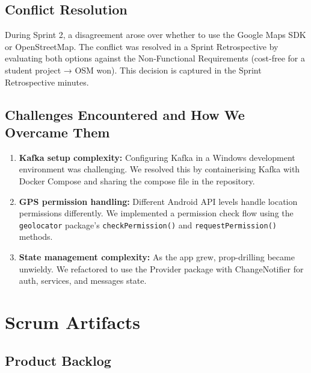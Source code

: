 \documentclass[12pt,a4paper]{report}
\begin{document}
\subsection{Conflict Resolution}

During Sprint 2, a disagreement arose over whether to use the Google Maps SDK or OpenStreetMap. The conflict was resolved in a Sprint Retrospective by evaluating both options against the Non-Functional Requirements (cost-free for a student project → OSM won). This decision is captured in the Sprint Retrospective minutes.

\subsection{Challenges Encountered and How We Overcame Them}

\begin{enumerate}
  \item \textbf{Kafka setup complexity:} Configuring Kafka in a Windows development environment was challenging. We resolved this by containerising Kafka with Docker Compose and sharing the compose file in the repository.
  \item \textbf{GPS permission handling:} Different Android API levels handle location permissions differently. We implemented a permission check flow using the \texttt{geolocator} package's \texttt{checkPermission()} and \texttt{requestPermission()} methods.
  \item \textbf{State management complexity:} As the app grew, prop-drilling became unwieldy. We refactored to use the Provider package with ChangeNotifier for auth, services, and messages state.
\end{enumerate}

\section{Scrum Artifacts}

\subsection{Product Backlog}
\end{document}
